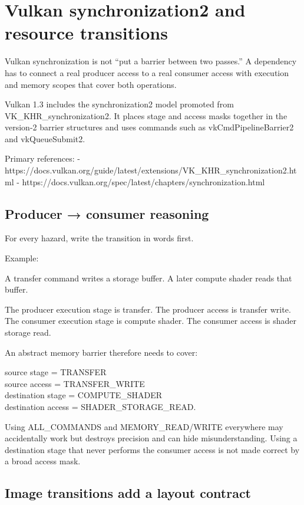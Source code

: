 \hypertarget{appendix-f15ce0d9c170}{}
\section{Vulkan synchronization2 and resource transitions}\label{appendix-f15ce0d9c170-vulkan-synchronization2-and-resource-transitions}

Vulkan synchronization is not ``put a barrier between two passes.'' A dependency has to connect a real producer access to a real consumer access with execution and memory scopes that cover both operations.

Vulkan 1.3 includes the synchronization2 model promoted from VK\_KHR\_synchronization2. It places stage and access masks together in the version-2 barrier structures and uses commands such as vkCmdPipelineBarrier2 and vkQueueSubmit2.

Primary references: - https://docs.vulkan.org/guide/latest/extensions/VK\_KHR\_synchronization2.html - https://docs.vulkan.org/spec/latest/chapters/synchronization.html

\subsection{Producer → consumer reasoning}\label{appendix-f15ce0d9c170-producer-consumer-reasoning}

For every hazard, write the transition in words first.

Example:

A transfer command writes a storage buffer. A later compute shader reads that buffer.

The producer execution stage is transfer. The producer access is transfer write. The consumer execution stage is compute shader. The consumer access is shader storage read.

An abstract memory barrier therefore needs to cover:

source stage = TRANSFER\\
source access = TRANSFER\_WRITE\\
destination stage = COMPUTE\_SHADER\\
destination access = SHADER\_STORAGE\_READ.

Using ALL\_COMMANDS and MEMORY\_READ/WRITE everywhere may accidentally work but destroys precision and can hide misunderstanding. Using a destination stage that never performs the consumer access is not made correct by a broad access mask.

\subsection{Image transitions add a layout contract}\label{appendix-f15ce0d9c170-image-transitions-add-a-layout-contract}


